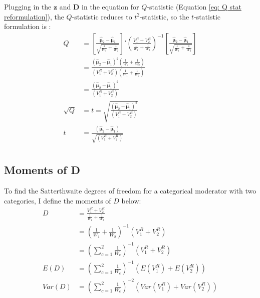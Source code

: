 Plugging in the $\mathbf{z}$ and $\mathbf{D}$ in the equation for $Q$-statistic (Equation \ref{eq: Q stat reformulation}),  the $Q$-statistic reduces to  $t^2$-statistic, so the $t$-statistic formulation is :
\begin{equation}
    \begin{split}
        Q &= \left[\frac{\mathbf{\hat{\mu}}_2 - \mathbf{\hat{\mu}}_1}{\sqrt{\frac{1}{W_1} + \frac{1}{W_2}}} \right]' \left( \frac{V^R_1 + V^R_2 }{\frac{1}{W_1} + \frac{1}{W_2} }  \right)^{-1} \left[\frac{ \mathbf{\hat{\mu}}_2 - \mathbf{\hat{\mu}}_1 }{\sqrt{\frac{1}{W_1} + \frac{1}{W_2}}}   \right] \\
         &= \frac{\left(\mathbf{\hat{\mu}}_2 - \mathbf{\hat{\mu}}_1  \right)^2 \left(\frac{1}{W_1} + \frac{1}{W_2}\right) }{\left(V^R_1 + V^R_2 \right)\left(\frac{1}{W_1} + \frac{1}{W_2}\right)} \\
         &= \frac{\left(\mathbf{\hat{\mu}}_2 - \mathbf{\hat{\mu}}_1  \right)^2}{\left(V^R_1 + V^R_2 \right)} \\
         \sqrt{Q} &= t = \sqrt{\frac{\left(\mathbf{\hat{\mu}}_2 - \mathbf{\hat{\mu}}_1  \right)^2}{\left(V^R_1 + V^R_2 \right)}} \\
         t &= \frac{\left(\mathbf{\hat{\mu}}_2 - \mathbf{\hat{\mu}}_1  \right)}{\sqrt{\left(V^R_1 + V^R_2 \right)} } \\
    \end{split}
    \nonumber
\end{equation}
  
\subsection{Moments of D}

To find the Satterthwaite degrees of freedom for a categorical moderator with two categories, I define the moments of $D$ below:
\begin{equation}
    \begin{split}
        D & = \frac{V^R_1 + V^R_2 }{\frac{1}{W_1} + \frac{1}{W_2} } \\
        & = \left(\frac{1}{W_1} + \frac{1}{W_2}\right)^{-1} \left(V^R_1 + V^R_2  \right) \\
        & = \left(\sum_{c=1}^2 \frac{1}{W_c}  \right)^{-1} \left(V^R_1 + V^R_2  \right) \\
        E(D) & = \left(\sum_{c=1}^2 \frac{1}{W_c}  \right)^{-1} \left(E(V^R_1) + E(V^R_2)  \right) \\
         Var(D) & = \left(\sum_{c=1}^2 \frac{1}{W_c}  \right)^{-2 } \left(Var(V^R_1) + Var(V^R_2)  \right) \\
    \end{split}
    \nonumber
\end{equation}

